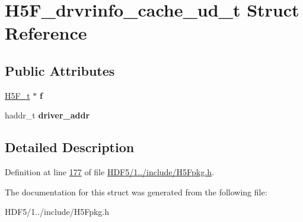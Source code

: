 \hypertarget{struct_h5_f__drvrinfo__cache__ud__t}{}\section{H5\+F\+\_\+drvrinfo\+\_\+cache\+\_\+ud\+\_\+t Struct Reference}
\label{struct_h5_f__drvrinfo__cache__ud__t}
\subsection*{Public Attributes}
\begin{DoxyCompactItemize}
\item 
\mbox{\label{struct_h5_f__drvrinfo__cache__ud__t_ae8ad981f89baf55c4d1f6d25223e4ea3}} 
\hyperlink{struct_h5_f__t}{H5\+F\+\_\+t} $\ast$ {\bfseries f}
\item 
\mbox{\label{struct_h5_f__drvrinfo__cache__ud__t_a5182a0785e8b0b62484ebc0837e98cd2}} 
haddr\+\_\+t {\bfseries driver\+\_\+addr}
\end{DoxyCompactItemize}


\subsection{Detailed Description}


Definition at line \hyperlink{_h_d_f5_21_810_81_2include_2_h5_fpkg_8h_source_l00177}{177} of file \hyperlink{_h_d_f5_21_810_81_2include_2_h5_fpkg_8h_source}{H\+D\+F5/1../include/\+H5\+Fpkg.\+h}.



The documentation for this struct was generated from the following file\+:\begin{DoxyCompactItemize}
\item 
H\+D\+F5/1../include/\+H5\+Fpkg.\+h\end{DoxyCompactItemize}
